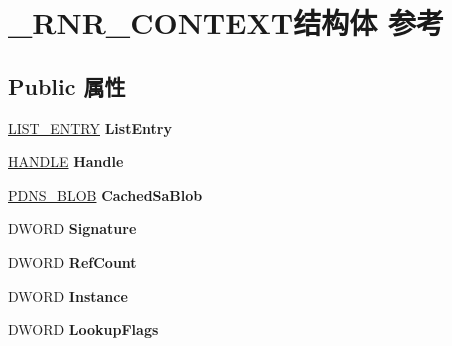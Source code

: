 \hypertarget{struct___r_n_r___c_o_n_t_e_x_t}{}\section{\+\_\+\+R\+N\+R\+\_\+\+C\+O\+N\+T\+E\+X\+T结构体 参考}
\label{struct___r_n_r___c_o_n_t_e_x_t}
\subsection*{Public 属性}
\begin{DoxyCompactItemize}
\item 
\mbox{\label{struct___r_n_r___c_o_n_t_e_x_t_a5b7c06d72826bbc461ee974a9860dc58}} 
\hyperlink{struct___l_i_s_t___e_n_t_r_y}{L\+I\+S\+T\+\_\+\+E\+N\+T\+RY} {\bfseries List\+Entry}
\item 
\mbox{\label{struct___r_n_r___c_o_n_t_e_x_t_a297a5cc53a80d4c9c2e9f5557b308c87}} 
\hyperlink{interfacevoid}{H\+A\+N\+D\+LE} {\bfseries Handle}
\item 
\mbox{\label{struct___r_n_r___c_o_n_t_e_x_t_a28b4f6c942b6b7c416b71e5c5333ae7d}} 
\hyperlink{struct___d_n_s___b_l_o_b}{P\+D\+N\+S\+\_\+\+B\+L\+OB} {\bfseries Cached\+Sa\+Blob}
\item 
\mbox{\label{struct___r_n_r___c_o_n_t_e_x_t_afa4c47d0e9c6261fa58e116dea4d6cbd}} 
D\+W\+O\+RD {\bfseries Signature}
\item 
\mbox{\label{struct___r_n_r___c_o_n_t_e_x_t_a39ff68c6bb7cd9f962edfad2acfc2629}} 
D\+W\+O\+RD {\bfseries Ref\+Count}
\item 
\mbox{\label{struct___r_n_r___c_o_n_t_e_x_t_a03b21763e557e1613dab7f8c62cedfe3}} 
D\+W\+O\+RD {\bfseries Instance}
\item 
\mbox{\label{struct___r_n_r___c_o_n_t_e_x_t_abcc7a97d388226a826b75f1c02200110}} 
D\+W\+O\+RD {\bfseries Lookup\+Flags}
\item 
\mbox{\label{struct___r_n_r___c_o_n_t_e_x_t_a0df4a6956116f67407e03374118bbbb5}} 

\end{DoxyCompactItemize}
